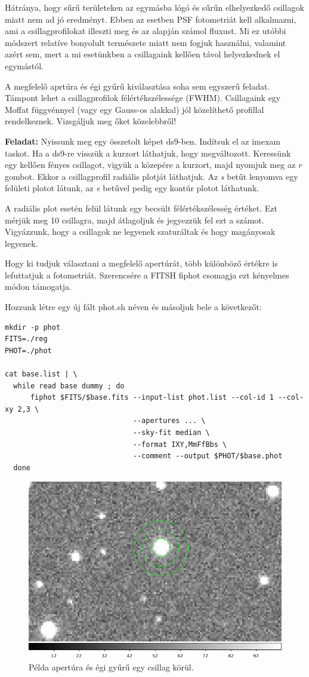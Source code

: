 \documentclass{article}
\begin{document}
Hátránya, hogy sűrű területeken az egymásba lógó és sűrűn elhelyezkedő
csillagok miatt nem ad jó eredményt. Ebben az esetben PSF fotometriát kell
alkalmazni, ami a csillagprofilokat illeszti meg és az alapján számol fluxust.
Mi ez utóbbi módszert relatíve bonyolult természete miatt nem fogjuk használni,
valamint azért sem, mert a mi esetünkben a csillagaink kellően távol
helyezkednek el egymástól.

A megfelelő aprtúra és égi gyűrű kiválasztása soha sem egyszerű feladat. Támpont
lehet a csillagprofilok félértékszélessége (FWHM). Csillagaink egy Moffat
függvénnyel (vagy egy Gauss-os alakkal) jól közelíthető profillal rendelkeznek.
Vizsgáljuk meg őket közelebbről!

{\bf Feladat:}
Nyissunk meg egy összetolt képet ds9-ben. Indítsuk el az imexam taskot.
Ha a ds9-re visszük a kurzort láthatjuk, hogy megváltozott. Keressünk egy
kellően fényes csillagot, vigyük a közepére a kurzort, majd nyomjuk meg az
{\it r} gombot. Ekkor a csillagprofil radiális plotját láthatjuk. Az {\it s}
betűt lenyomva egy felületi plotot látunk, az {\it e} betűvel pedig egy kontúr
plotot láthatunk.

A radiális plot esetén felül látunk egy becsült félértékszélesség értéket.
Ezt mérjük meg 10 csillagra, majd átlagoljuk és jegyezzük fel ezt a számot.
Vigyázzunk, hogy a csillagok ne legyenek szaturáltak és hogy magányosak
legyenek.


Hogy ki tudjuk választani a megfelelő apertúrát, több különböző értékre is
lefuttatjuk a fotometriát. Szerencsére a FITSH fiphot csomagja ezt kényelmes
módon támogatja.

Hozzunk létre egy új fált phot.sh néven és másoljuk bele a következőt:

\begin{verbatim}
mkdir -p phot
FITS=./reg
PHOT=./phot

cat base.list | \
  while read base dummy ; do
      fiphot $FITS/$base.fits --input-list phot.list --col-id 1 --col-xy 2,3 \
                              --apertures ... \
                              --sky-fit median \
                              --format IXY,MmFfBbs \
                              --comment --output $PHOT/$base.phot
  done
\end{verbatim}

\begin{figure}[ht!]
    \centering
    \includegraphics[width=0.6\linewidth]{pics/aperture.png}
    \caption{Példa apertúra és égi gyűrű egy csillag körül.}
    \label{apert}
\end{figure}
\end{document}
